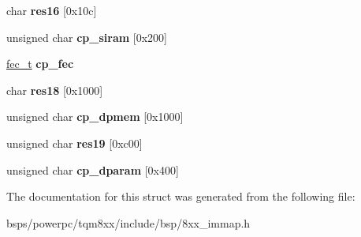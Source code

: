 \begin{DoxyCompactItemize}
char {\bfseries res16} \mbox{[}0x10c\mbox{]}
\item 
\mbox{\label{structcomm__proc_a9d1fde8e6a974de601a48d6c3eb95747}} 
unsigned char {\bfseries cp\+\_\+siram} \mbox{[}0x200\mbox{]}
\item 
\mbox{\label{structcomm__proc_a6b899f383873e772245b6a01b777f354}} 
\mbox{\hyperlink{structfec}{fec\+\_\+t}} {\bfseries cp\+\_\+fec}
\item 
\mbox{\label{structcomm__proc_abd7ddaec01c7c567a1768b6e82f7c235}} 
char {\bfseries res18} \mbox{[}0x1000\mbox{]}
\item 
\mbox{\label{structcomm__proc_a8a04af608db25bd14d111cf4014cd9ce}} 
unsigned char {\bfseries cp\+\_\+dpmem} \mbox{[}0x1000\mbox{]}
\item 
\mbox{\label{structcomm__proc_a183f4b0eb0fd44292dc36f850ae80cb7}} 
unsigned char {\bfseries res19} \mbox{[}0xc00\mbox{]}
\item 
\mbox{\label{structcomm__proc_a4c902157d518e97ef329a9fcdb44c46c}} 
unsigned char {\bfseries cp\+\_\+dparam} \mbox{[}0x400\mbox{]}
\end{DoxyCompactItemize}


The documentation for this struct was generated from the following file\+:\begin{DoxyCompactItemize}
\item 
bsps/powerpc/tqm8xx/include/bsp/8xx\+\_\+immap.\+h\end{DoxyCompactItemize}
